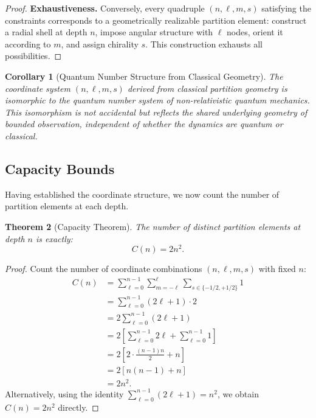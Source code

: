 \documentclass[twocolumn,10pt,a4paper]{article}
\newtheorem{theorem}{Theorem}[section]
\newtheorem{corollary}[theorem]{Corollary}
\theoremstyle{remark}
\begin{document}
\begin{proof}
\textbf{Exhaustiveness.} Conversely, every quadruple $(n, \ell, m, s)$ satisfying the constraints corresponds to a geometrically realizable partition element: construct a radial shell at depth $n$, impose angular structure with $\ell$ nodes, orient it according to $m$, and assign chirality $s$. This construction exhausts all possibilities.
\end{proof}

\begin{corollary}[Quantum Number Structure from Classical Geometry]
\label{cor:quantum_structure}
The coordinate system $(n, \ell, m, s)$ derived from classical partition geometry is isomorphic to the quantum number system of non-relativistic quantum mechanics. This isomorphism is not accidental but reflects the shared underlying geometry of bounded observation, independent of whether the dynamics are quantum or classical.
\end{corollary}

\subsection{Capacity Bounds}

Having established the coordinate structure, we now count the number of partition elements at each depth.

\begin{theorem}[Capacity Theorem]
\label{thm:capacity}
The number of distinct partition elements at depth $n$ is exactly:
\begin{equation}
C(n) = 2n^2.
\end{equation}
\end{theorem}

\begin{proof}
Count the number of coordinate combinations $(n, \ell, m, s)$ with fixed $n$:
\begin{align}
C(n) &= \sum_{\ell=0}^{n-1} \sum_{m=-\ell}^{\ell} \sum_{s \in \{-1/2, +1/2\}} 1 \\
&= \sum_{\ell=0}^{n-1} (2\ell + 1) \cdot 2 \\
&= 2 \sum_{\ell=0}^{n-1} (2\ell + 1) \\
&= 2 \left[\sum_{\ell=0}^{n-1} 2\ell + \sum_{\ell=0}^{n-1} 1\right] \\
&= 2 \left[2 \cdot \frac{(n-1)n}{2} + n\right] \\
&= 2[n(n-1) + n] \\
&= 2n^2.
\end{align}
Alternatively, using the identity $\sum_{\ell=0}^{n-1}(2\ell + 1) = n^2$, we obtain $C(n) = 2n^2$ directly.
\end{proof}
\end{document}
